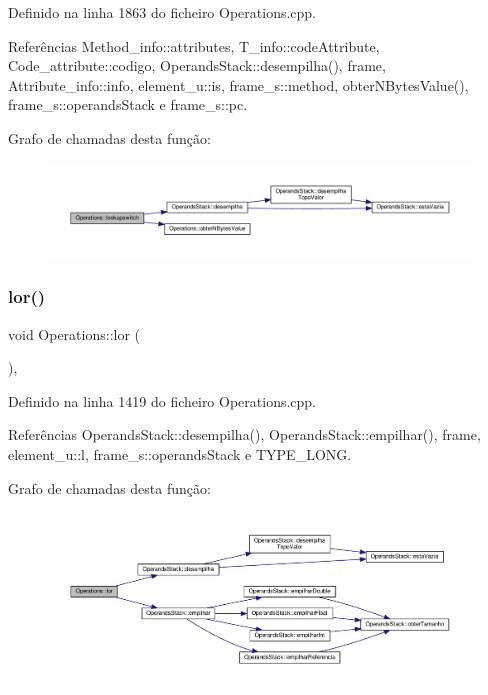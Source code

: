 Definido na linha 1863 do ficheiro Operations.\+cpp.



Referências Method\+\_\+info\+::attributes, T\+\_\+info\+::code\+Attribute, Code\+\_\+attribute\+::codigo, Operands\+Stack\+::desempilha(), frame, Attribute\+\_\+info\+::info, element\+\_\+u\+::is, frame\+\_\+s\+::method, obter\+N\+Bytes\+Value(), frame\+\_\+s\+::operands\+Stack e frame\+\_\+s\+::pc.

Grafo de chamadas desta função\+:
\nopagebreak
\begin{figure}[H]
\begin{center}
\leavevmode
\includegraphics[width=350pt]{classOperations_a0458ee466daff63a3698973c89cfe71a_cgraph}
\end{center}
\end{figure}
\mbox{\label{classOperations_a89193dfaaa2c4c45f320c6b9f0b5601c}} 
\subsubsection{\texorpdfstring{lor()}{lor()}}
{\footnotesize\ttfamily void Operations\+::lor (\begin{DoxyParamCaption}{ }\end{DoxyParamCaption})\hspace{0.3cm}{\ttfamily [static]}, {\ttfamily [private]}}



Definido na linha 1419 do ficheiro Operations.\+cpp.



Referências Operands\+Stack\+::desempilha(), Operands\+Stack\+::empilhar(), frame, element\+\_\+u\+::l, frame\+\_\+s\+::operands\+Stack e T\+Y\+P\+E\+\_\+\+L\+O\+NG.

Grafo de chamadas desta função\+:
\nopagebreak
\begin{figure}[H]
\begin{center}
\leavevmode
\includegraphics[width=350pt]{classOperations_a89193dfaaa2c4c45f320c6b9f0b5601c_cgraph}
\end{center}
\end{figure}
\mbox{\label{classOperations_a437e4b34f2f1be8982d36f0cdf47f98c}} 
